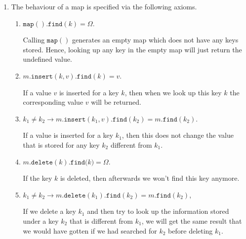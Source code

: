 \begin{Definition}[Map]
{\begin{enumerate}
\begin{enumerate}
              The function call returns the resulting map.
        \item $\texttt{delete}: \textsl{Map} \times \textsl{Key} \rightarrow \textsl{Map}$

              The function call
              \\[0.2cm]
              \hspace*{1.3cm}
              $m.\texttt{delete}(k)$ 
              \\[0.2cm]
              removes the key $k$ and any value associated with $k$ from the map $m$.  If the map $m$ does not contain a value for the
              key $k$, then the map is returned unchanged.

              The function call returns the new map. 
        \end{enumerate}
  \item The behaviour of a map is specified via the following axioms.
        \begin{enumerate}
        \item $\texttt{map}().\texttt{find}(k) = \Omega$.

              Calling $\texttt{map}()$ generates an empty map which does not have any keys stored.
              Hence, looking up any key in the empty map will just return the undefined value.
        \item $m.\texttt{insert}(k, v).\texttt{find}(k) = v$.

              If a value $v$ is inserted for a key $k$, then when we look up this key $k$ the corresponding value
              $v$ will be returned.
        \item $k_1 \not= k_2 \rightarrow m.\texttt{insert}(k_1, v).\texttt{find}(k_2) = m.\texttt{find}(k_2)$.

              If a value is inserted for a key $k_1$, then this does not change the value that is stored
              for any key $k_2$  different from $k_1$.
        \item $m.\texttt{delete}(k).\texttt{find}(k\bigr) = \Omega$.

              If the key $k$ is deleted, then afterwards we won't find this key anymore.
        \item $k_1 \not= k_2 \rightarrow 
               m.\texttt{delete}(k_1).\texttt{find}(k_2) = m.\texttt{find}(k_2)$,

              If  we delete a key $k_1$ and then try to look up the information stored under a key
              $k_2$ that is different from $k_1$, we will get the same result that we would have gotten
              if we had searched for $k_2$ before deleting $k_1$.
              \eox
        \end{enumerate}
  \end{enumerate}
}
\end{Definition}

